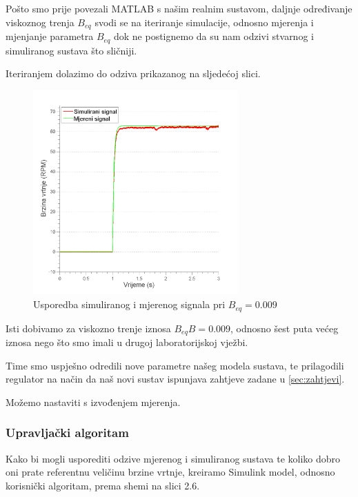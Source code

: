\documentclass[12pt,a4paper]{article}
\begin{document}
\newpage

Pošto smo prije povezali MATLAB s našim realnim sustavom, daljnje određivanje viskoznog trenja $B_{eq}$ svodi se na iteriranje simulacije, odnosno mjerenja i mjenjanje parametra $B_{eq}$ dok ne postignemo da su nam odzivi stvarnog i simuliranog sustava što sličniji.

Iteriranjem dolazimo do odziva prikazanog na sljedećoj slici.

\begin{figure}[h]
	\begin{center}
	\includegraphics[width=0.7\textwidth]{tester_odziv.png}
    \caption{Usporedba simuliranog i mjerenog signala pri $B_{eq} = 0.009$}
    \end{center}
\end{figure}

Isti dobivamo za viskozno trenje iznosa $B_{eq}B = 0.009$, odnosno šest puta većeg iznosa nego što smo imali u drugoj laboratorijskoj vježbi.

Time smo uspješno odredili nove parametre našeg modela sustava, te prilagodili regulator na način da naš novi sustav ispunjava zahtjeve zadane u \ref{sec:zahtjevi}.

Možemo nastaviti s izvođenjem mjerenja.


\subsubsection{Upravljački algoritam}

Kako bi mogli usporediti odzive mjerenog i simuliranog sustava te koliko dobro oni prate referentnu veličinu brzine vrtnje, kreiramo Simulink model, odnosno korisnički algoritam, prema shemi na slici 2.6.
\end{document}
